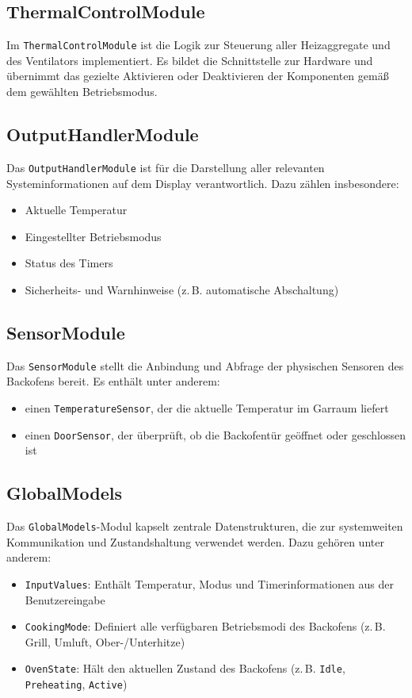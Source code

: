 \documentclass[a4paper,12pt]{article}
\begin{document}
\subsection*{ThermalControlModule}
Im \texttt{ThermalControlModule} ist die Logik zur Steuerung aller Heizaggregate und des Ventilators implementiert. Es bildet die Schnittstelle zur Hardware und übernimmt das gezielte Aktivieren oder Deaktivieren der Komponenten gemäß dem gewählten Betriebsmodus.

\subsection*{OutputHandlerModule}
Das \texttt{OutputHandlerModule} ist für die Darstellung aller relevanten Systeminformationen auf dem Display verantwortlich. Dazu zählen insbesondere:
\begin{itemize}
    \item Aktuelle Temperatur
    \item Eingestellter Betriebsmodus
    \item Status des Timers
    \item Sicherheits- und Warnhinweise (z.\,B. automatische Abschaltung)
\end{itemize}

\subsection*{SensorModule}
Das \texttt{SensorModule} stellt die Anbindung und Abfrage der physischen Sensoren des Backofens bereit. Es enthält unter anderem:
\begin{itemize}
    \item einen \texttt{TemperatureSensor}, der die aktuelle Temperatur im Garraum liefert
    \item einen \texttt{DoorSensor}, der überprüft, ob die Backofentür geöffnet oder geschlossen ist
\end{itemize}

\subsection*{GlobalModels}
Das \texttt{GlobalModels}-Modul kapselt zentrale Datenstrukturen, die zur systemweiten Kommunikation und Zustandshaltung verwendet werden. Dazu gehören unter anderem:
\begin{itemize}
    \item \texttt{InputValues}: Enthält Temperatur, Modus und Timerinformationen aus der Benutzereingabe
    \item \texttt{CookingMode}: Definiert alle verfügbaren Betriebsmodi des Backofens (z.\,B. Grill, Umluft, Ober-/Unterhitze)
    \item \texttt{OvenState}: Hält den aktuellen Zustand des Backofens (z.\,B. \texttt{Idle}, \texttt{Preheating}, \texttt{Active})
\end{itemize}
\end{document}
